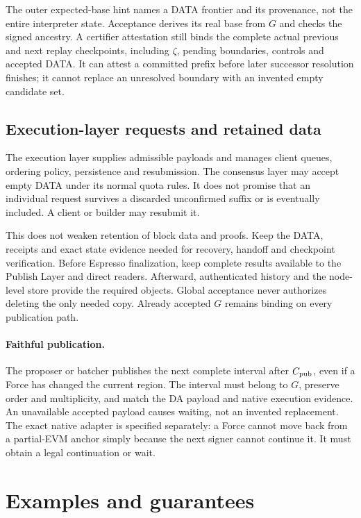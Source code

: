 \documentclass[11pt,a4paper]{article}
\begin{document}
The outer expected-base hint names a DATA frontier and its provenance,
not the entire interpreter state. Acceptance derives its real base from
$G$ and checks the signed ancestry. A certifier attestation still binds
the complete actual previous and next replay checkpoints, including
$\zeta$, pending boundaries, controls and accepted DATA. It can attest a
committed prefix before later successor resolution finishes; it cannot
replace an unresolved boundary with an invented empty candidate set.

\subsection{Execution-layer requests and retained data}
\label{sec:requests}
The execution layer supplies admissible payloads and manages client
queues, ordering policy, persistence and resubmission. The consensus
layer may accept empty DATA under its normal quota rules. It does not
promise that an individual request survives a discarded unconfirmed
suffix or is eventually included. A client or builder may resubmit it.

This does not weaken retention of block data and proofs. Keep the DATA,
receipts and exact state evidence needed for recovery, handoff and
checkpoint verification. Before Espresso finalization, keep complete
results available to the Publish Layer and direct readers. Afterward,
authenticated history and the node-level store provide the required
objects. Global acceptance never authorizes deleting the only needed
copy. Already accepted $G$ remains binding on every publication path.

\paragraph{Faithful publication.}
The proposer or batcher publishes the next complete interval after
$C_{\rm pub}$, even if a Force has changed the current region.
The interval must belong to $G$, preserve order and multiplicity, and
match the DA payload and native execution evidence. An unavailable
accepted payload causes waiting, not an invented replacement.
The exact native adapter is specified separately: a Force cannot move
back from a partial-EVM anchor simply because the next signer cannot
continue it. It must obtain a legal continuation or wait.

\section{Examples and guarantees}
\label{sec:examples}
\end{document}
